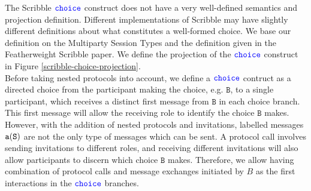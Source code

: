 \documentclass[12pt,twoside]{report}
\begin{document}


 


The Scribble ${\color{blue}\mathtt{choice}}$ construct does not have a very well-defined semantics and projection definition. Different implementations of Scribble may have slightly different definitions about what constitutes a well-formed choice.  We base our definition on the Multiparty Session Types\cite{gentleintrotompst} and the definition given in the Featherweight Scribble paper\cite{featherweight}. We define the projection of the ${\color{blue}\mathtt{choice}}$ construct in Figure \ref{scribble-choice-projection}.\\


Before taking nested protocols into account, we define a ${\color{blue}\mathtt{choice}}$ contruct as a directed choice from the participant making the choice, e.g. $\mathtt{B}$, to a single participant, which receives a distinct first message from $\mathtt{B}$ in each choice branch. This first message will allow the receiving role to identify the choice $\mathtt{B}$ makes. However, with the addition of nested protocols and invitations, labelled messages $\mathtt{a}(\mathtt{S})$ are not the only type of messages which can be sent. A protocol call involves sending invitations to different roles, and receiving different invitations will also allow participants to discern which choice $\mathtt{B}$ makes. Therefore, we allow having combination of protocol calls and message exchanges initiated by $B$ as the first interactions in the ${\color{blue}\mathtt{choice}}$ branches.\\
\end{document}
